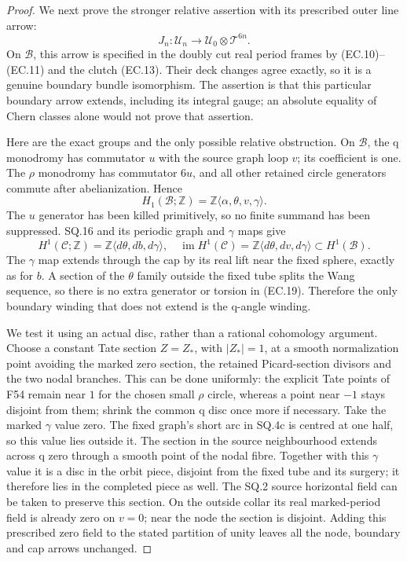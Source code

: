 \begin{proof}
We next prove the stronger relative assertion with its prescribed
outer line arrow:
\[
 J_n:\mathcal U_n\longrightarrow
                    \mathcal U_0\otimes\mathcal T^{6n}.
                                                        \tag{EC.17}
\]
On \(\mathcal B\), this arrow is specified in the doubly cut real
period frames by (EC.10)--(EC.11) and the clutch (EC.13).
Their deck changes agree exactly, so it is a genuine boundary
bundle isomorphism. The assertion is that this particular boundary
arrow extends, including its integral gauge; an absolute equality
of Chern classes alone would not prove that assertion.

Here are the exact groups and the only possible relative obstruction.
On \(\mathcal B\), the q monodromy has commutator \(u\) with the
source graph loop \(v\); its coefficient is one. The \(\rho\) monodromy
has commutator \(6u\), and all other retained circle generators
commute after abelianization. Hence
\[
 H_1(\mathcal B;\mathbb Z)
       =\mathbb Z\langle\alpha,\theta,v,\gamma\rangle.
                                                        \tag{EC.18}
\]
The \(u\) generator has been killed primitively, so no finite
summand has been suppressed. SQ.16 and its periodic graph and
\(\gamma\) maps give
\[
 H^1(\mathcal C;\mathbb Z)
       =\mathbb Z\langle d\theta,db,d\gamma\rangle,
\quad
 \operatorname{im}H^1(\mathcal C)
       =\mathbb Z\langle d\theta,dv,d\gamma\rangle
                   \subset H^1(\mathcal B).           \tag{EC.19}
\]
The \(\gamma\) map extends through the cap by its real lift near the
fixed sphere, exactly as for \(b\). A section of the \(\theta\)
family outside the fixed tube splits the Wang sequence, so there
is no extra generator or torsion in (EC.19). Therefore the only
boundary winding that does not extend is the q-angle winding.

We test it using an actual disc, rather than a rational cohomology
argument. Choose a constant Tate section \(Z=Z_*\), with
\(|Z_*|=1\), at a smooth normalization point avoiding the
marked zero section, the retained Picard-section divisors and
the two nodal branches. This can be done uniformly: the explicit
Tate points of F54 remain near \(1\) for the chosen small \(\rho\)
circle, whereas a point near \(-1\) stays disjoint from them;
shrink the common q disc once more if necessary. Take the marked \(\gamma\)
value zero. The fixed graph's short arc in SQ.4c is centred at
one half, so this value lies outside it. The section in the
source neighbourhood extends across q zero through a smooth
point of the nodal fibre. Together with this \(\gamma\) value it is
a disc in the orbit piece, disjoint from the fixed tube and its
surgery; it therefore lies in the completed piece as well.
The SQ.2 source horizontal field can be taken to preserve this
section. On the outside collar its real marked-period field is
already zero on \(v=0\); near the node the section is disjoint.
Adding this prescribed zero field to the stated partition of
unity leaves all the node, boundary and cap arrows unchanged.


\end{proof}
